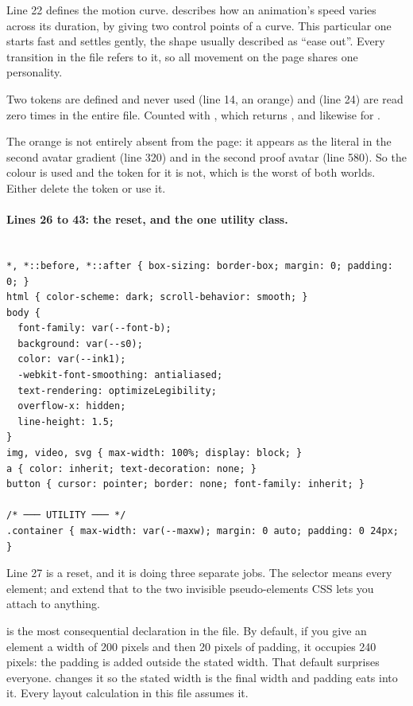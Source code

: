 Line 22 defines the motion curve.  describes how
an animation's speed varies across its duration, by giving two control points of a
curve. This particular one starts fast and settles gently, the shape usually
described as ``ease out''. Every transition in the file refers to it, so all
movement on the page shares one personality.

\begin{honest}{Two tokens are defined and never used}
 (line 14, an orange) and  (line 24) are read zero
times in the entire file. Counted with , which
returns , and likewise for .

The orange is not entirely absent from the page: it appears as the literal
 in the second avatar gradient (line 320) and  in
the second proof avatar (line 580). So the colour is used and the token for it is
not, which is the worst of both worlds. Either delete the token or use it.
\end{honest}

\paragraph{Lines 26 to 43: the reset, and the one utility class.}

\begin{lstlisting}[firstnumber=26,caption={\file{css/site.css}, lines 26--43}]

*, *::before, *::after { box-sizing: border-box; margin: 0; padding: 0; }
html { color-scheme: dark; scroll-behavior: smooth; }
body {
  font-family: var(--font-b);
  background: var(--s0);
  color: var(--ink1);
  -webkit-font-smoothing: antialiased;
  text-rendering: optimizeLegibility;
  overflow-x: hidden;
  line-height: 1.5;
}
img, video, svg { max-width: 100%; display: block; }
a { color: inherit; text-decoration: none; }
button { cursor: pointer; border: none; font-family: inherit; }

/* ─── UTILITY ─── */
.container { max-width: var(--maxw); margin: 0 auto; padding: 0 24px; }
\end{lstlisting}

Line 27 is a reset, and it is doing three separate jobs. The selector \code{*}
means every element;  and  extend that to the two
invisible pseudo-elements CSS lets you attach to anything.

 is the most consequential declaration in the file.
By default, if you give an element a width of 200 pixels and then 20 pixels of
padding, it occupies 240 pixels: the padding is added outside the stated width.
That default surprises everyone.  changes it so the stated width
is the final width and padding eats into it. Every layout calculation in this
file assumes it.

